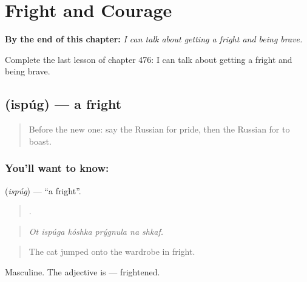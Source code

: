 
\chapter{Fright and Courage}
\label{ch:ru-fright-and-courage}

\begin{chapteropening}
\textbf{By the end of this chapter:} \emph{I can talk about getting a fright and being brave.}

Complete the last lesson of chapter 476: I can talk about getting a fright and being brave.
\end{chapteropening}

\section[\texorpdfstring{\ru{испуг} (ispúg)}{испуг (ispúg)}]{ (ispúg) — a fright}

\label{lesson:RU-C476-ispug}



\begin{quote}
Before the new one: say the Russian for pride, then the Russian for to boast.
\end{quote}

\subsection*{You'll want to know: }
\textbf{} (\emph{ispúg}) — \textquotedblleft{}a fright\textquotedblright{}.

\begin{quote}
     .
\end{quote}

\begin{quote}
\emph{Ot ispúga kóshka prýgnula na shkaf.}
\end{quote}

\begin{quote}
The cat jumped onto the wardrobe in fright.
\end{quote}

Masculine. The adjective is \emph{} — frightened.

